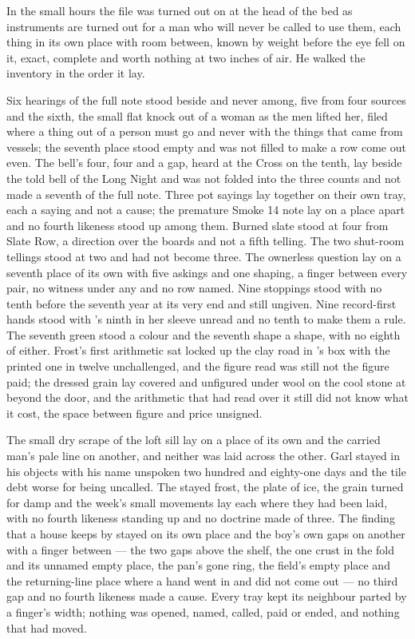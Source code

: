 \scenebreak

In the small hours the file was turned out on  at the head of the bed as instruments are turned out for a man who will never be called to use them, each thing in its own place with room between, known by weight before the eye fell on it, exact, complete and worth nothing at two inches of air. He walked the inventory in the order it lay.

Six hearings of the full note stood beside and never among, five from four sources and the sixth, the small flat knock out of a woman as the men lifted her, filed where a thing out of a person must go and never with the things that came from vessels; the seventh place stood empty and was not filled to make a row come out even. The bell's four, four and a gap, heard at the Cross on the tenth, lay beside the told bell of the Long Night and was not folded into the three counts and not made a seventh of the full note. Three pot sayings lay together on their own tray, each a saying and not a cause; the premature Smoke 14 note lay on a place apart and no fourth likeness stood up among them. Burned slate stood at four from Slate Row, a direction over the boards and not a fifth telling. The two shut-room tellings stood at two and had not become three. The ownerless question lay on a seventh place of its own with five askings and one shaping, a finger between every pair, no witness under any and no row named. Nine stoppings stood with no tenth before the seventh year at its very end and still ungiven. Nine record-first hands stood with 's ninth in her sleeve unread and no tenth to make them a rule. The seventh green stood a colour and the seventh shape a shape, with no eighth of either. Frost's first arithmetic sat locked up the clay road in 's box with the printed one in twelve unchallenged, and the figure read was still not the figure paid; the dressed grain lay covered and unfigured under wool on the cool stone at  beyond the door, and the arithmetic that had read over it still did not know what it cost, the space between figure and price unsigned.

The small dry scrape of the loft sill lay on a place of its own and the carried man's pale line on another, and neither was laid across the other. Garl stayed in his objects with his name unspoken two hundred and eighty-one days and the tile debt worse for being uncalled. The stayed frost, the plate of ice, the grain turned for damp and the week's small movements lay each where they had been laid, with no fourth likeness standing up and no doctrine made of three. The finding that a house keeps by  stayed on its own place and the boy's own gaps on another with a finger between --- the two gaps above the shelf, the one crust in the fold and its unnamed empty place, the pan's gone ring, the field's empty place and the returning-line place where a hand went in and did not come out --- no third gap and no fourth likeness made a cause. Every tray kept its neighbour parted by a finger's width; nothing was opened, named, called, paid or ended, and nothing that had moved.


